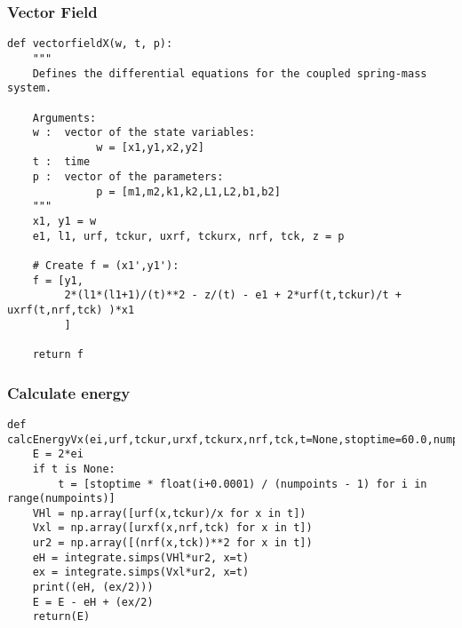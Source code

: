 \documentclass[11pt,a4paper]{article}
\begin{document}
\subsubsection{Vector Field}
\label{sec:org8216bed}
\begin{verbatim}
def vectorfieldX(w, t, p):
    """
    Defines the differential equations for the coupled spring-mass system.

    Arguments:
    w :  vector of the state variables:
              w = [x1,y1,x2,y2]
    t :  time
    p :  vector of the parameters:
              p = [m1,m2,k1,k2,L1,L2,b1,b2]
    """
    x1, y1 = w
    e1, l1, urf, tckur, uxrf, tckurx, nrf, tck, z = p

    # Create f = (x1',y1'):
    f = [y1,
         2*(l1*(l1+1)/(t)**2 - z/(t) - e1 + 2*urf(t,tckur)/t + uxrf(t,nrf,tck) )*x1
         ]

    return f
\end{verbatim}
\subsubsection{Calculate energy}
\label{sec:orge0f3a58}
\begin{verbatim}
def calcEnergyVx(ei,urf,tckur,urxf,tckurx,nrf,tck,t=None,stoptime=60.0,numpoints=3200):
    E = 2*ei
    if t is None:
        t = [stoptime * float(i+0.0001) / (numpoints - 1) for i in range(numpoints)]
    VHl = np.array([urf(x,tckur)/x for x in t])
    Vxl = np.array([urxf(x,nrf,tck) for x in t])
    ur2 = np.array([(nrf(x,tck))**2 for x in t])
    eH = integrate.simps(VHl*ur2, x=t)
    ex = integrate.simps(Vxl*ur2, x=t)
    print((eH, (ex/2)))
    E = E - eH + (ex/2)
    return(E)
\end{verbatim}
\end{document}
